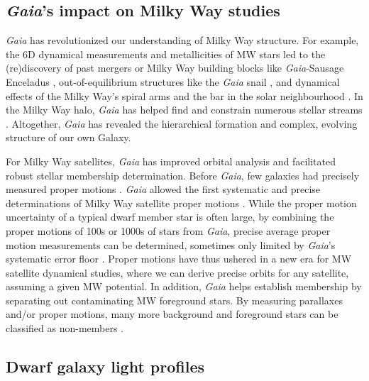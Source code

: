 \subsection{\texorpdfstring{\emph{Gaia}'s impact on Milky Way
studies}{Gaia's impact on Milky Way studies}}\label{gaias-impact-on-milky-way-studies}

\emph{Gaia} has revolutionized our understanding of Milky Way structure.
For example, the 6D dynamical measurements and metallicities of MW stars
led to the (re)discovery of past mergers or Milky Way building blocks
like \emph{Gaia}-Sausage Enceladus
\citetext{\citealp[e.g.,][]{helmi+2018}; \citealp{belokurov+2018}; \citealp[but
see also][]{meza+2005}}, out-of-equilibrium structures like the
\emph{Gaia} snail \citep[e.g.,][]{antoja+2018}, and dynamical effects of
the Milky Way's spiral arms and the bar in the solar neighbourhood
\citep[ and references therein]{hunt+vasiliev2025}. In the Milky Way
halo, \emph{Gaia} has helped find and constrain numerous stellar streams
\citep{ibata+malhan+martin2019, bonaca+price-whelan2025}. Altogether,
\emph{Gaia} has revealed the hierarchical formation and complex,
evolving structure of our own Galaxy.

For Milky Way satellites, \emph{Gaia} has improved orbital analysis and
facilitated robust stellar membership determination. Before \emph{Gaia},
few galaxies had precisely measured proper motions \citep[e.g.~using
Hubble Space Telescope,][]{piatek+2005, sohn+2017}. \emph{Gaia} allowed
the first systematic and precise determinations of Milky Way satellite
proper motions \citep{pace+li2019, MV2020a}. While the proper motion
uncertainty of a typical dwarf member star is often large, by combining
the proper motions of 100s or 1000s of stars from \emph{Gaia}, precise
average proper motion measurements can be determined, sometimes only
limited by \emph{Gaia}'s systematic error floor
\citep[e.g.,][]{MV2020a}. Proper motions have thus ushered in a new era
for MW satellite dynamical studies, where we can derive precise orbits
for any satellite, assuming a given MW potential. In addition,
\emph{Gaia} helps establish membership by separating out contaminating
MW foreground stars. By measuring parallaxes and/or proper motions, many
more background and foreground stars can be classified as non-members
\citep[e.g.,][]{battaglia+2022, jensen+2024}.

\subsection{Dwarf galaxy light profiles}\label{sec:exponential_profiles}

